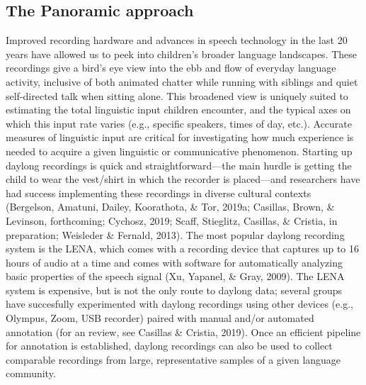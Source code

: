 \documentclass[,man,floatsintext]{apa6}
\begin{document}
\subsection{The Panoramic approach}\label{the-panoramic-approach}

Improved recording hardware and advances in speech technology in the
last 20 years have allowed us to peek into children's broader language
landscapes. These recordings give a bird's eye view into the ebb and
flow of everyday language activity, inclusive of both animated chatter
while running with siblings and quiet self-directed talk when sitting
alone. This broadened view is uniquely suited to estimating the total
linguistic input children encounter, and the typical axes on which this
input rate varies (e.g., specific speakers, times of day, etc.).
Accurate measures of linguistic input are critical for investigating how
much experience is needed to acquire a given linguistic or communicative
phenomenon. Starting up daylong recordings is quick and
straightforward---the main hurdle is getting the child to wear the
vest/shirt in which the recorder is placed---and researchers have had
success implementing these recordings in diverse cultural contexts
(Bergelson, Amatuni, Dailey, Koorathota, \& Tor, 2019a; Casillas, Brown,
\& Levinson, forthcoming; Cychosz, 2019; Scaff, Stieglitz, Casillas, \&
Cristia, in preparation; Weisleder \& Fernald, 2013). The most popular
daylong recording system is the LENA, which comes with a recording
device that captures up to 16 hours of audio at a time and comes with
software for automatically analyzing basic properties of the speech
signal (Xu, Yapanel, \& Gray, 2009). The LENA system is expensive, but
is not the only route to daylong data; several groups have succesfully
experimented with daylong recordings using other devices (e.g., Olympus,
Zoom, USB recorder) paired with manual and/or automated annotation (for
an review, see Casillas \& Cristia, 2019). Once an efficient pipeline
for annotation is established, daylong recordings can also be used to
collect comparable recordings from large, representative samples of a
given language community.
\end{document}
